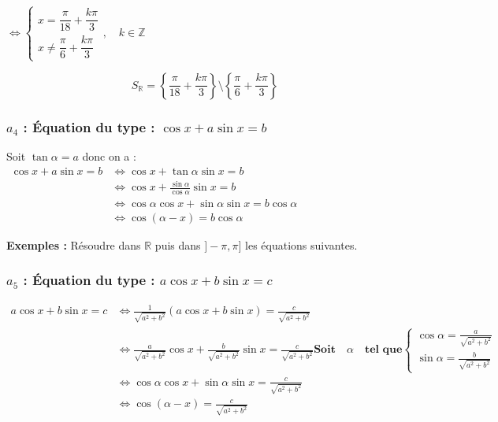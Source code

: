 \documentclass[12pt,a4paper]{article}
\begin{document}
\vspace{0.2cm}

\noindent {} $\iff \begin{cases} x = \dfrac{\pi}{18} + \dfrac{k\pi}{3} \\[4mm] x \neq \dfrac{\pi}{6} + \dfrac{k\pi}{3} \end{cases} , \quad k \in \mathbb{Z}$

\vspace{0.5cm}

\[
S_{\mathbb{R}} = \left\{ \frac{\pi}{18} + \frac{k\pi}{3} \right\} \setminus \left\{ \frac{\pi}{6} + \frac{k\pi}{3} \right\}
\]

\subsubsection*{\textbf{ $a_4$ : Équation du type : $\cos x + a \sin x = b$ }}

Soit $\tan \alpha = a$ donc on a : \\

$
\begin{aligned}
\cos x + a \sin x = b &\iff \cos x + \tan \alpha \sin x = b\\
&\iff \cos x + \frac{\sin \alpha}{\cos \alpha} \sin x = b\\
&\iff \cos \alpha \cos x + \sin \alpha \sin x = b \cos \alpha \\
&\iff \cos(\alpha - x) = b \cos \alpha
\end{aligned}
$

\vspace{1cm}

\textbf{Exemples :} Résoudre dans $\mathbb{R}$ puis dans $]-\pi, \pi]$ les équations suivantes.

\subsubsection*{\textbf{ $a_5$ : Équation du type : $a \cos x + b \sin x = c$ }}

\vspace{0.5cm}

$
\begin{aligned}
a \cos x + b \sin x = c &\iff \frac{1}{\sqrt{a^2+b^2}}(a \cos x + b \sin x) = \frac{c}{\sqrt{a^2+b^2}}\\
&\iff \frac{a}{\sqrt{a^2+b^2}} \cos x + \frac{b}{\sqrt{a^2+b^2}} \sin x = \frac{c}{\sqrt{a^2+b^2}}
\textbf{Soit}\quad \alpha \quad \textbf{tel que}
\begin{cases}
    \cos \alpha = \frac{a}{\sqrt{a^2+b^2}}\\[3mm]
    \sin \alpha = \frac{b}{\sqrt{a^2+b^2}}
\end{cases}\\
&\iff \cos \alpha \cos x + \sin \alpha \sin x =\frac{c}{\sqrt{a^2+b^2}}\\
&\iff \cos(\alpha - x) =\frac{c}{\sqrt{a^2+b^2}}\\
\end{aligned}
$
\end{document}
